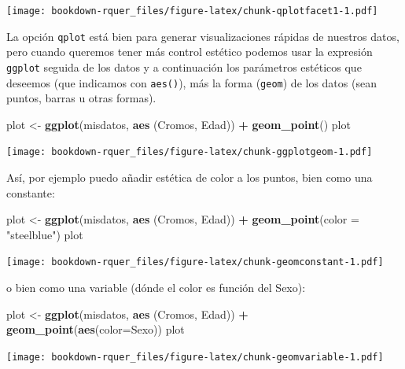 \documentclass[]{book}
\newenvironment{Shaded}{\begin{snugshade}}{\end{snugshade}}
\newcommand{\DataTypeTok}[1]{\textcolor[rgb]{0.13,0.29,0.53}{#1}}
\newcommand{\KeywordTok}[1]{\textcolor[rgb]{0.13,0.29,0.53}{\textbf{#1}}}
\newcommand{\NormalTok}[1]{#1}
\newcommand{\OperatorTok}[1]{\textcolor[rgb]{0.81,0.36,0.00}{\textbf{#1}}}
\newcommand{\StringTok}[1]{\textcolor[rgb]{0.31,0.60,0.02}{#1}}
\theoremstyle{definition}
\theoremstyle{definition}
\theoremstyle{definition}
\theoremstyle{remark}
\begin{document}
\texttt{[image: bookdown-rquer\_files/figure-latex/chunk-qplotfacet1-1.pdf]}

La opción \texttt{qplot} está bien para generar visualizaciones rápidas
de nuestros datos, pero cuando queremos tener más control estético
podemos usar la expresión \texttt{ggplot} seguida de los datos y a
continuación los parámetros estéticos que deseemos (que indicamos con
\texttt{aes()}), más la forma (\texttt{geom}) de los datos (sean puntos,
barras u otras formas).

\begin{Shaded}
\begin{Highlighting}[]
\NormalTok{plot <-}\StringTok{ }\KeywordTok{ggplot}\NormalTok{(misdatos, }\KeywordTok{aes}\NormalTok{ (Cromos, Edad)) }\OperatorTok{+}\StringTok{ }\KeywordTok{geom_point}\NormalTok{()}
\NormalTok{plot}
\end{Highlighting}
\end{Shaded}

\texttt{[image: bookdown-rquer\_files/figure-latex/chunk-ggplotgeom-1.pdf]}

Así, por ejemplo puedo añadir estética de color a los puntos, bien como
una constante:

\begin{Shaded}
\begin{Highlighting}[]
\NormalTok{plot <-}\StringTok{ }\KeywordTok{ggplot}\NormalTok{(misdatos, }\KeywordTok{aes}\NormalTok{ (Cromos, Edad)) }\OperatorTok{+}\StringTok{ }\KeywordTok{geom_point}\NormalTok{(}\DataTypeTok{color =} \StringTok{"steelblue"}\NormalTok{)}
\NormalTok{plot}
\end{Highlighting}
\end{Shaded}

\texttt{[image: bookdown-rquer\_files/figure-latex/chunk-geomconstant-1.pdf]}

o bien como una variable (dónde el color es función del Sexo):

\begin{Shaded}
\begin{Highlighting}[]
\NormalTok{plot <-}\StringTok{ }\KeywordTok{ggplot}\NormalTok{(misdatos, }\KeywordTok{aes}\NormalTok{ (Cromos, Edad)) }\OperatorTok{+}\StringTok{ }\KeywordTok{geom_point}\NormalTok{(}\KeywordTok{aes}\NormalTok{(}\DataTypeTok{color=}\NormalTok{Sexo))}
\NormalTok{plot}
\end{Highlighting}
\end{Shaded}

\texttt{[image: bookdown-rquer\_files/figure-latex/chunk-geomvariable-1.pdf]}
\end{document}
